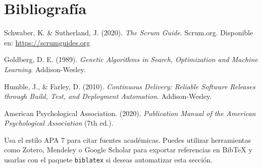 \newpage
\section{Bibliografía}

\begin{thebibliography}{99}

  Schwaber, K. \& Sutherland, J. (2020). \textit{The Scrum Guide}. Scrum.org. Disponible en: \url{https://scrumguides.org}

  Goldberg, D. E. (1989). \textit{Genetic Algorithms in Search, Optimization and Machine Learning}. Addison-Wesley.

  Humble, J., \& Farley, D. (2010). \textit{Continuous Delivery: Reliable Software Releases through Build, Test, and Deployment Automation}. Addison-Wesley.

  American Psychological Association. (2020). \textit{Publication Manual of the American Psychological Association} (7th ed.).

\end{thebibliography}

\vspace{0.5cm}

\begin{tcolorbox}[colback=gray!10, colframe=black!30, title={Sugerencia para esta sección}]
  Usa el estilo APA 7 para citar fuentes académicas. Puedes utilizar herramientas como Zotero, Mendeley o Google Scholar para exportar referencias en BibTeX y usarlas con el paquete \texttt{biblatex} si deseas automatizar esta sección.
\end{tcolorbox}

\newpage
